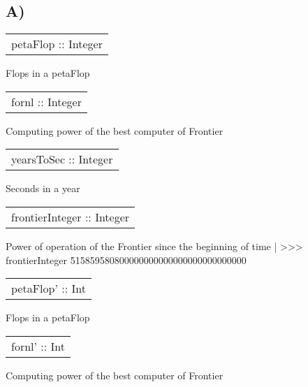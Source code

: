 \subsection{A)}
\begin{haddockdesc}
\item[\begin{tabular}{@{}l}
petaFlop :: Integer
\end{tabular}]
{\haddockbegindoc
Flops in a petaFlop\par}
\end{haddockdesc}
\begin{haddockdesc}
\item[\begin{tabular}{@{}l}
fornl :: Integer
\end{tabular}]
{\haddockbegindoc
Computing power of the best computer of Frontier\par}
\end{haddockdesc}
\begin{haddockdesc}
\item[\begin{tabular}{@{}l}
yearsToSec :: Integer
\end{tabular}]
{\haddockbegindoc
Seconds in a year\par}
\end{haddockdesc}
\begin{haddockdesc}
\item[\begin{tabular}{@{}l}
frontierInteger :: Integer
\end{tabular}]
{\haddockbegindoc
Power of operation of the Frontier since the beginning of time
 | >>> frontierInteger
 515859580800000000000000000000000000\par}
\end{haddockdesc}
\begin{haddockdesc}
\item[\begin{tabular}{@{}l}
petaFlop' :: Int
\end{tabular}]
{\haddockbegindoc
Flops in a petaFlop\par}
\end{haddockdesc}
\begin{haddockdesc}
\item[\begin{tabular}{@{}l}
fornl' :: Int
\end{tabular}]
{\haddockbegindoc
Computing power of the best computer of Frontier\par}
\end{haddockdesc}
